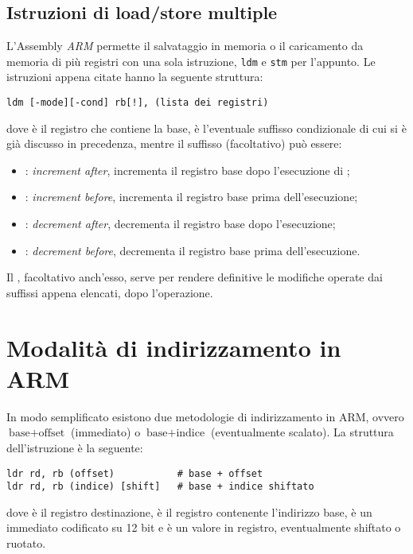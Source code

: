 \documentclass[class=book, crop=false, oneside]{standalone}
\begin{document}
\subsection*{Istruzioni di load/store multiple}
L'Assembly \emph{ARM} permette il salvataggio in memoria o il caricamento da memoria di più registri con una sola istruzione, \texttt{ldm} e \texttt{stm} per l'appunto. Le istruzioni appena citate hanno la seguente struttura:
\begin{center}
	\texttt{ldm [-mode][-cond] rb[!], (lista dei registri)}
\end{center}
dove  è il registro che contiene la base,  è l'eventuale suffisso condizionale di cui si è già discusso in precedenza, mentre il suffisso (facoltativo)  può essere:
\begin{itemize}
	\item {}: \emph{increment after}, incrementa il registro base dopo l'esecuzione di ;
	\item {}: \emph{increment before}, incrementa il registro base prima dell'esecuzione;
	\item {}: \emph{decrement after}, decrementa il registro base dopo l'esecuzione;
	\item {}: \emph{decrement before}, decrementa il registro base prima dell'esecuzione.
\end{itemize}

Il \suffix{!}, facoltativo anch'esso, serve per rendere definitive le modifiche operate dai suffissi appena elencati, dopo l'operazione.

\section{Modalità di indirizzamento in ARM}
In modo semplificato esistono due metodologie di indirizzamento in ARM, ovvero \(\textrm{base} + \textrm{offset}\) (immediato) o \(\textrm{base} + \textrm{indice}\) (eventualmente scalato). La struttura dell'istruzione è la seguente:

\begin{verbatim}
ldr rd, rb (offset)           # base + offset
ldr rd, rb (indice) [shift]   # base + indice shiftato
\end{verbatim}
dove  è il registro destinazione,  è il registro contenente l'indirizzo base,  è un immediato codificato su 12 bit e  è un valore in registro, eventualmente shiftato o ruotato.
\end{document}

